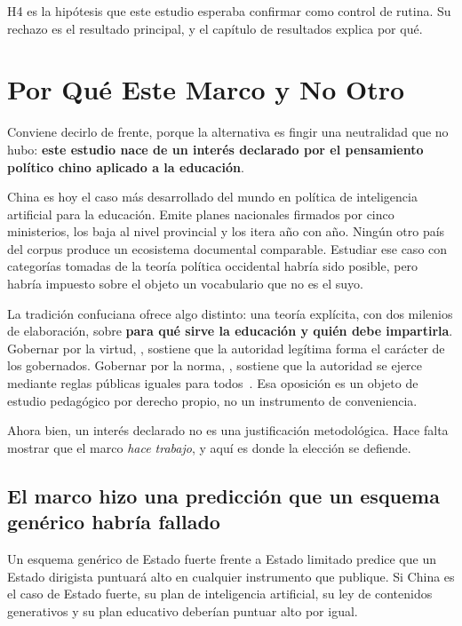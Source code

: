 H4 es la hipótesis que este estudio esperaba confirmar como control de rutina. Su rechazo es el resultado principal, y el capítulo de resultados explica por qué.


\section{Por Qué Este Marco y No Otro}
\label{sec:por-que-confuciano}

Conviene decirlo de frente, porque la alternativa es fingir una neutralidad que no hubo: \textbf{este estudio nace de un interés declarado por el pensamiento político chino aplicado a la educación}.

China es hoy el caso más desarrollado del mundo en política de inteligencia artificial para la educación. Emite planes nacionales firmados por cinco ministerios, los baja al nivel provincial y los itera año con año. Ningún otro país del corpus produce un ecosistema documental comparable. Estudiar ese caso con categorías tomadas de la teoría política occidental habría sido posible, pero habría impuesto sobre el objeto un vocabulario que no es el suyo.

La tradición confuciana ofrece algo distinto: una teoría explícita, con dos milenios de elaboración, sobre \textbf{para qué sirve la educación y quién debe impartirla}. Gobernar por la virtud, \dezhi, sostiene que la autoridad legítima forma el carácter de los gobernados. Gobernar por la norma, \fa, sostiene que la autoridad se ejerce mediante reglas públicas iguales para todos~\citep{pines2023legalism}. Esa oposición es un objeto de estudio pedagógico por derecho propio, no un instrumento de conveniencia.

Ahora bien, un interés declarado no es una justificación metodológica. Hace falta mostrar que el marco \textit{hace trabajo}, y aquí es donde la elección se defiende.

\subsection*{El marco hizo una predicción que un esquema genérico habría fallado}

Un esquema genérico de Estado fuerte frente a Estado limitado predice que un Estado dirigista puntuará alto en cualquier instrumento que publique. Si China es el caso de Estado fuerte, su plan de inteligencia artificial, su ley de contenidos generativos y su plan educativo deberían puntuar alto por igual.

